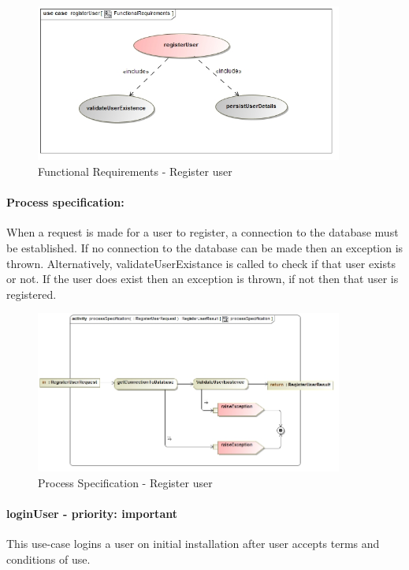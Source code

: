 \documentclass[hidelinks, 12pt, oneside]{article}
\begin{document}
		
		\begin{figure}[!htbp]
    		\centering
    		\includegraphics[width=0.9\textwidth]{img/functionalRequirementsRegister.jpg}
    		\caption{Functional Requirements - Register user}
    		\label{fig:FunctionalReq_registerUser}
		\end{figure}
		
		
		
		\paragraph{Process specification:}		
		When a request is made for a user to register, a connection to the database must be established. If no connection to the database can be made then an exception is thrown. Alternatively, validateUserExistance is called to check if that user exists or not. If the user does exist then an exception is thrown, if not then that user is registered.
		
		\begin{figure}[!htbp]
    		\centering
    		\includegraphics[width=0.9\textwidth]{img/processSpecificationRegisterUser.jpg}
    		\caption{Process Specification - Register user}
    		\label{fig:ProcessSpec_registerUser}
		\end{figure}
				
	
	\paragraph{loginUser - priority: important}
		This use-case logins a user on initial installation after user accepts terms and conditions of use.
		
\end{document}
